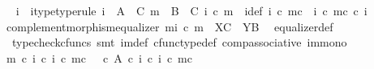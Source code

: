 \begin{isabellebody}
\ \isamarkupfalse%
\ i{\isacharprime}{\kern0pt}\ \ i{\isacharprime}{\kern0pt}{\isacharunderscore}{\kern0pt}type{\isacharbrackleft}{\kern0pt}type{\isacharunderscore}{\kern0pt}rule{\isacharbrackright}{\kern0pt}{\isacharcolon}{\kern0pt}\ {\isachardoublequoteopen}i{\isacharprime}{\kern0pt}\ {\isacharcolon}{\kern0pt}\ A\ {\isasymsetminus}\ {\isacharparenleft}{\kern0pt}C{\isacharcomma}{\kern0pt}\ m{\isacharparenright}{\kern0pt}\ {\isasymrightarrow}\ B\ {\isasymsetminus}\ {\isacharparenleft}{\kern0pt}C{\isacharcomma}{\kern0pt}\ i\ {\isasymcirc}\isactrlsub c\ m{\isacharparenright}{\kern0pt}{\isachardoublequoteclose}\ \ i{\isacharprime}{\kern0pt}{\isacharunderscore}{\kern0pt}def{\isacharcolon}{\kern0pt}\ {\isachardoublequoteopen}i\ {\isasymcirc}\isactrlsub c\ m\isactrlsup c\ {\isacharequal}{\kern0pt}\ {\isacharparenleft}{\kern0pt}i\ {\isasymcirc}\isactrlsub c\ m{\isacharparenright}{\kern0pt}\isactrlsup c\ {\isasymcirc}\isactrlsub c\ i{\isacharprime}{\kern0pt}{\isachardoublequoteclose}\isanewline
\ \ \ \ \isamarkupfalse%
\ complement{\isacharunderscore}{\kern0pt}morphism{\isacharunderscore}{\kern0pt}equalizer{\isacharbrackleft}{\kern0pt}\ m{\isacharequal}{\kern0pt}{\isachardoublequoteopen}i\ {\isasymcirc}\isactrlsub c\ m{\isachardoublequoteclose}{\isacharcomma}{\kern0pt}\ \ X{\isacharequal}{\kern0pt}C{\isacharcomma}{\kern0pt}\ \ Y{\isacharequal}{\kern0pt}B{\isacharbrackright}{\kern0pt}\ \isamarkupfalse%
\ equalizer{\isacharunderscore}{\kern0pt}def\isanewline
\ \ \ \ \isamarkupfalse%
\ {\isacharparenleft}{\kern0pt}{\isacharminus}{\kern0pt}{\isacharcomma}{\kern0pt}\ typecheck{\isacharunderscore}{\kern0pt}cfuncs{\isacharcomma}{\kern0pt}\ smt\ {\isasymchi}im{\isacharunderscore}{\kern0pt}def\ cfunc{\isacharunderscore}{\kern0pt}type{\isacharunderscore}{\kern0pt}def\ comp{\isacharunderscore}{\kern0pt}associative{}\ im{\isacharunderscore}{\kern0pt}mono{\isacharparenright}{\kern0pt}\isanewline
\isanewline
\ \ \isamarkupfalse%
\ {\isachardoublequoteopen}{\isasymchi}m\ {\isasymcirc}\isactrlsub c\ {\isacharparenleft}{\kern0pt}i\isactrlbold {\isasyminverse}\ {\isasymcirc}\isactrlsub c\ {\isacharparenleft}{\kern0pt}i\ {\isasymcirc}\isactrlsub c\ m{\isacharparenright}{\kern0pt}\isactrlsup c{\isacharparenright}{\kern0pt}\ {\isacharequal}{\kern0pt}\ {\isasymf}\ {\isasymcirc}\isactrlsub c\ {\isasymbeta}\isactrlbsub A\isactrlesub \ {\isasymcirc}\isactrlsub c\ {\isacharparenleft}{\kern0pt}i\isactrlbold {\isasyminverse}\ {\isasymcirc}\isactrlsub c\ {\isacharparenleft}{\kern0pt}i\ {\isasymcirc}\isactrlsub c\ m{\isacharparenright}{\kern0pt}\isactrlsup c{\isacharparenright}{\kern0pt}{\isachardoublequoteclose}\isanewline

\end{isabellebody}
